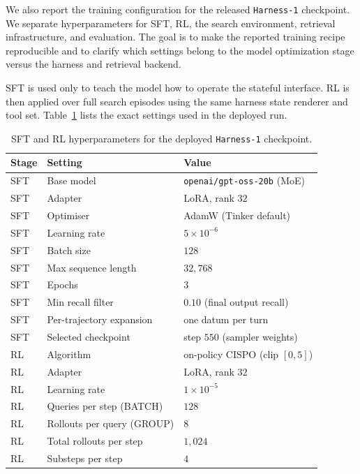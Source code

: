 \documentclass{article}
\newcommand{\sys}{\texttt{Harness-1}\xspace}
\begin{document}
We also report the training configuration for the released \sys
checkpoint. We separate hyperparameters for SFT, RL, the search environment,
retrieval infrastructure, and evaluation. The goal is to make the reported
training recipe reproducible and to clarify which settings belong to the model
optimization stage versus the harness and retrieval backend.

SFT is used only to teach the model how to operate the stateful interface. RL is
then applied over full search episodes using the same harness state renderer and
tool set. Table~\ref{tab:hp-train} lists the exact settings used in the
deployed run.

\begin{table}[ht]
\centering
\small
\caption{SFT and RL hyperparameters for the deployed \sys
checkpoint.}
\label{tab:hp-train}
\begin{tabular}{lll}
\toprule
\textbf{Stage} & \textbf{Setting} & \textbf{Value} \\
\midrule
SFT & Base model                 & \texttt{openai/gpt-oss-20b} (MoE) \\
SFT & Adapter                    & LoRA, rank $32$ \\
SFT & Optimiser                  & AdamW (Tinker default) \\
SFT & Learning rate              & $5\times10^{-6}$ \\
SFT & Batch size                 & $128$ \\
SFT & Max sequence length        & $32{,}768$ \\
SFT & Epochs                     & $3$ \\
SFT & Min recall filter          & $0.10$ (final output recall) \\
SFT & Per-trajectory expansion   & one datum per turn \\
SFT & Selected checkpoint        & step $550$ (sampler weights) \\
\midrule
RL  & Algorithm                  & on-policy CISPO (clip $[0,5]$) \\
RL  & Adapter                    & LoRA, rank $32$ \\
RL  & Learning rate              & $1\times10^{-5}$ \\
RL  & Queries per step (BATCH)   & $128$ \\
RL  & Rollouts per query (GROUP) & $8$ \\
RL  & Total rollouts per step    & $1{,}024$ \\
RL  & Substeps per step          & $4$ \\

\end{tabular}
\end{table}
\end{document}
